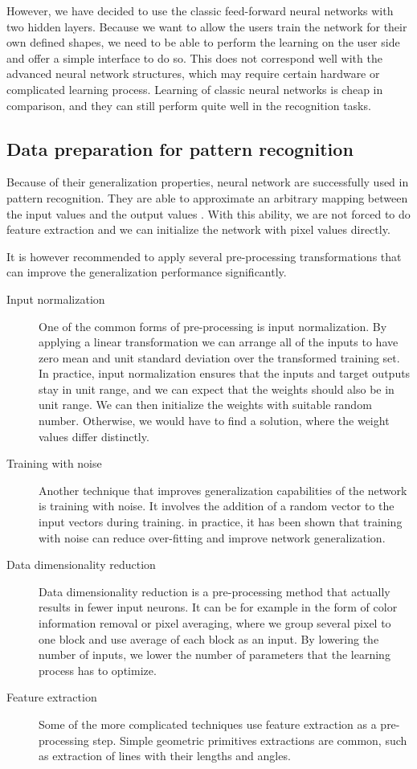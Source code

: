 However,  we have decided to use the classic feed-forward neural networks with two hidden layers. Because we want to allow the users train the network for their own defined shapes, we need to be able to perform the learning on the user side and offer a simple interface to do so.
This does not correspond well with the advanced neural network structures, which may require certain  hardware or complicated learning process. Learning of classic neural networks is cheap in comparison, and they can still perform quite well in the recognition tasks.

\subsection{Data preparation for pattern recognition}
\cite{bishop}  Because of their generalization properties, neural network are successfully used in pattern recognition. They are able to approximate an arbitrary mapping between the input values and the output values \cite{bishop}. With this ability, we are not forced to do feature extraction and we can initialize the network with pixel values directly.

It is however recommended to apply several pre-processing transformations that can improve the generalization performance significantly.
\begin{description}
\item [Input normalization]
One of the common forms of pre-processing is input normalization. By applying a linear transformation we can arrange all of the inputs to have zero mean and unit standard deviation over the transformed training set.
In practice, input normalization ensures that the inputs and target outputs stay in unit range, and we can expect that the weights should also be in unit range. We can then initialize the weights with suitable random number. Otherwise, we would have to find a solution, where the weight values differ distinctly.
\item [Training with noise]
Another technique that improves generalization capabilities of the network is training with noise. It involves the addition of a random vector to the input vectors during training. in practice, it has been shown that training with noise can reduce over-fitting and improve network generalization. 
\item [Data dimensionality reduction]
Data dimensionality reduction is a pre-processing method that actually results  in fewer input neurons. It can be for example in the form  of color information removal or pixel averaging, where we group several pixel to one block and use average of each block as an input. By lowering the number of inputs, we lower the number of parameters that the learning process has to optimize.
\item [Feature extraction]
Some of the more complicated techniques use feature extraction as a pre-processing step. Simple geometric primitives extractions are common, such as extraction of lines with their lengths and angles.
\end{description}
